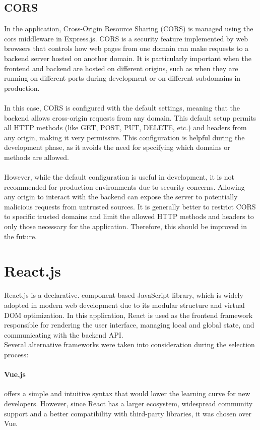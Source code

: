 \documentclass[a4paper,12pt]{report}
\begin{document}
\subsection{CORS}
In the application, Cross-Origin Resource Sharing (CORS) is managed using the cors middleware in Express.js. CORS is a security feature implemented by web browsers that controls how web pages from one domain can make requests to a backend server hosted on another domain. It is particularly important when the frontend and backend are hosted on different origins, such as when they are running on different ports during development or on different subdomains in production. \\ \\
In this case, CORS is configured with the default settings, meaning that the backend allows cross-origin requests from any domain. This default setup permits all HTTP methods (like GET, POST, PUT, DELETE, etc.) and headers from any origin, making it very permissive. This configuration is helpful during the development phase, as it avoids the need for specifying which domains or methods are allowed. \\ \\
However, while the default configuration is useful in development, it is not recommended for production environments due to security concerns. Allowing any origin to interact with the backend can expose the server to potentially malicious requests from untrusted sources. It is generally better to restrict CORS to specific trusted domains and limit the allowed HTTP methods and headers to only those necessary for the application. Therefore, this should be improved in the future. \cite{mdn-cors}

\section{React.js}
React.js is a declarative. component-based JavaScript library, which is widely adopted in modern web development due to its modular structure and virtual DOM optimization. In this application, React is used as the frontend framework responsible for rendering the user interface, managing local and global state, and communicating with the backend API. \cite{react-docs}\\
Several alternative frameworks were taken into consideration during the selection process:
\paragraph{Vue.js} offers a simple and intuitive syntax that would lower the learning curve for new developers. However, since React has a larger ecosystem, widespread community support and a better compatibility with third-party libraries, it was chosen over Vue. \cite{react-docs} \cite{vue-docs} \\ \\
\end{document}
